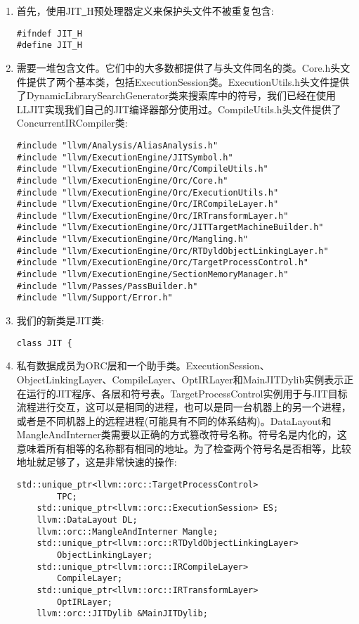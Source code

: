 \begin{enumerate}
\item 首先，使用JIT\underline{~}H预处理器定义来保护头文件不被重复包含:
\begin{lstlisting}[caption={}]
#ifndef JIT_H
#define JIT_H
\end{lstlisting}

\item 需要一堆包含文件。它们中的大多数都提供了与头文件同名的类。Core.h头文件提供了两个基本类，包括ExecutionSession类。ExecutionUtils.h头文件提供了DynamicLibrarySearchGenerator类来搜索库中的符号，我们已经在使用LLJIT实现我们自己的JIT编译器部分使用过。CompileUtils.h头文件提供了ConcurrentIRCompiler类:
\begin{lstlisting}[caption={}]
#include "llvm/Analysis/AliasAnalysis.h"
#include "llvm/ExecutionEngine/JITSymbol.h"
#include "llvm/ExecutionEngine/Orc/CompileUtils.h"
#include "llvm/ExecutionEngine/Orc/Core.h"
#include "llvm/ExecutionEngine/Orc/ExecutionUtils.h"
#include "llvm/ExecutionEngine/Orc/IRCompileLayer.h"
#include "llvm/ExecutionEngine/Orc/IRTransformLayer.h"
#include "llvm/ExecutionEngine/Orc/JITTargetMachineBuilder.h"
#include "llvm/ExecutionEngine/Orc/Mangling.h"
#include "llvm/ExecutionEngine/Orc/RTDyldObjectLinkingLayer.h"
#include "llvm/ExecutionEngine/Orc/TargetProcessControl.h"
#include "llvm/ExecutionEngine/SectionMemoryManager.h"
#include "llvm/Passes/PassBuilder.h"
#include "llvm/Support/Error.h"
\end{lstlisting}

\item 我们的新类是JIT类:
\begin{lstlisting}[caption={}]
class JIT {
\end{lstlisting}

\item 私有数据成员为ORC层和一个助手类。ExecutionSession、ObjectLinkingLayer、CompileLayer、OptIRLayer和MainJITDylib实例表示正在运行的JIT程序、各层和符号表。TargetProcessControl实例用于与JIT目标流程进行交互，这可以是相同的进程，也可以是同一台机器上的另一个进程，或者是不同机器上的远程进程(可能具有不同的体系结构)。DataLayout和MangleAndInterner类需要以正确的方式篡改符号名称。符号名是内化的，这意味着所有相等的名称都有相同的地址。为了检查两个符号名是否相等，比较地址就足够了，这是非常快速的操作:
\begin{lstlisting}[caption={}]
	std::unique_ptr<llvm::orc::TargetProcessControl> 
		TPC;
	std::unique_ptr<llvm::orc::ExecutionSession> ES;
	llvm::DataLayout DL;
	llvm::orc::MangleAndInterner Mangle;
	std::unique_ptr<llvm::orc::RTDyldObjectLinkingLayer>
		ObjectLinkingLayer;
	std::unique_ptr<llvm::orc::IRCompileLayer>
		CompileLayer;
	std::unique_ptr<llvm::orc::IRTransformLayer>
		OptIRLayer;
	llvm::orc::JITDylib &MainJITDylib;
\end{lstlisting}


\end{enumerate}
